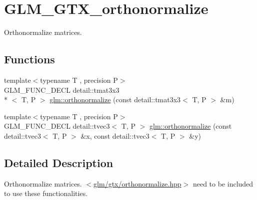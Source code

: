 \hypertarget{group__gtx__orthonormalize}{\section{G\-L\-M\-\_\-\-G\-T\-X\-\_\-orthonormalize}
\label{group__gtx__orthonormalize}
}


Orthonormalize matrices.  


\subsection*{Functions}
\begin{DoxyCompactItemize}
\item 
{\footnotesize template$<$typename T , precision P$>$ }\\G\-L\-M\-\_\-\-F\-U\-N\-C\-\_\-\-D\-E\-C\-L detail\-::tmat3x3\\*
$<$ T, P $>$ \hyperlink{group__gtx__orthonormalize_ga2d615d8b740d7d11e583651c34103e40}{glm\-::orthonormalize} (const detail\-::tmat3x3$<$ T, P $>$ \&m)
\item 
{\footnotesize template$<$typename T , precision P$>$ }\\G\-L\-M\-\_\-\-F\-U\-N\-C\-\_\-\-D\-E\-C\-L detail\-::tvec3$<$ T, P $>$ \hyperlink{group__gtx__orthonormalize_ga41d176cb31fda91b672655c839084b43}{glm\-::orthonormalize} (const detail\-::tvec3$<$ T, P $>$ \&x, const detail\-::tvec3$<$ T, P $>$ \&y)
\end{DoxyCompactItemize}


\subsection{Detailed Description}
Orthonormalize matrices. $<$\hyperlink{orthonormalize_8hpp}{glm/gtx/orthonormalize.\-hpp}$>$ need to be included to use these functionalities. 

